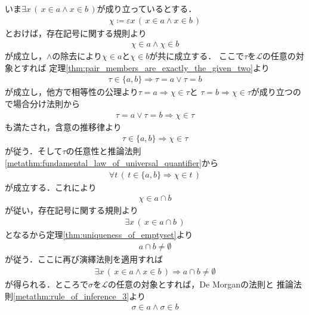 	\begin{prf}
		いま$\exists x\, (\, x \in a \wedge x \in b\, )$が成り立っているとする．
		\begin{align}
			\chi \coloneqq \varepsilon x\, (\, x \in a \wedge x \in b\, )
		\end{align}
		とおけば，存在記号に関する規則より
		\begin{align}
			\chi \in a \wedge \chi \in b
		\end{align}
		が成立し，$\wedge$の除去により$\chi \in a$と$\chi \in b$が共に成立する．
		ここで$\tau$を$\mathcal{L}$の任意の対象とすれば
		定理\ref{thm:pair_members_are_exactly_the_given_two}より
		\begin{align}
			\tau \in \{a,b\} \Longrightarrow \tau = a \vee \tau = b
		\end{align}
		が成立し，他方で相等性の公理より$\tau = a \Longrightarrow \chi \in \tau$と
		$\tau = b \Longrightarrow \chi \in \tau$が成り立つので場合分け法則から
		\begin{align}
			\tau = a \vee \tau = b \Longrightarrow \chi \in \tau
		\end{align}
		も満たされ，含意の推移律より
		\begin{align}
			\tau \in \{a,b\} \Longrightarrow \chi \in \tau
		\end{align}
		が従う．そして$\tau$の任意性と推論法則\ref{metathm:fundamental_law_of_universal_quantifier}から
		\begin{align}
			\forall t\, \left(\, t \in \{a,b\} \Longrightarrow \chi \in t\, \right)
		\end{align}
		が成立する．これにより
		\begin{align}
			\chi \in a \cap b
		\end{align}
		が従い，存在記号に関する規則より
		\begin{align}
			\exists x\, (\, x \in a \cap b\, )
		\end{align}
		となるから定理\ref{thm:uniqueness_of_emptyset}より
		\begin{align}
			a \cap b \neq \emptyset
		\end{align}
		が従う．ここに再び演繹法則を適用すれば
		\begin{align}
			\exists x\, (\, x \in a \wedge x \in b\, ) \Longrightarrow a \cap b \neq \emptyset
		\end{align}
		が得られる．ところで$\sigma$を$\mathcal{L}$の任意の対象とすれば，De Morganの法則と
		推論法則\ref{metathm:rule_of_inference_3}より
		\begin{align}
			\sigma \in a \wedge \sigma \in b 

\end{align}
\end{prf}
